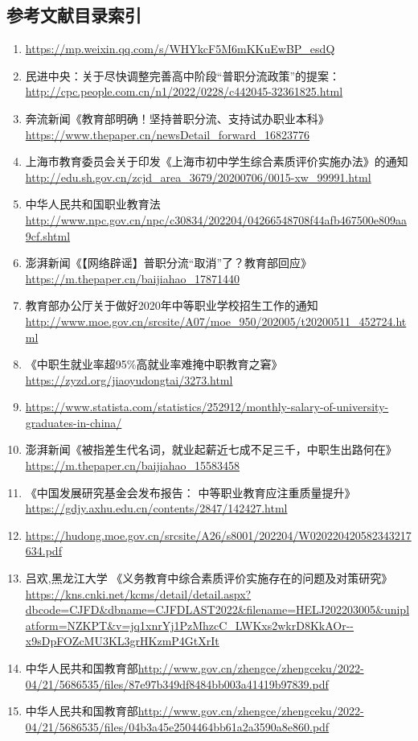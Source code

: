 \documentclass[12pt,UTF8]{ctexart}
\begin{document}
\subsection{参考文献目录索引}
\begin{enumerate}[1.]
\item \url{https://mp.weixin.qq.com/s/WHYkcF5M6mKKuEwBP_esdQ}
\item 民进中央：关于尽快调整完善高中阶段“普职分流政策”的提案：\url{http://cpc.people.com.cn/n1/2022/0228/c442045-32361825.html}
\item 奔流新闻《教育部明确！坚持普职分流、支持试办职业本科》 \url{https://www.thepaper.cn/newsDetail_forward_16823776}
\item 上海市教育委员会关于印发《上海市初中学生综合素质评价实施办法》的通知\url{http://edu.sh.gov.cn/zcjd_area_3679/20200706/0015-xw_99991.html}
\item 中华人民共和国职业教育法\url{http://www.npc.gov.cn/npc/c30834/202204/04266548708f44afb467500e809aa9cf.shtml}
\item 澎湃新闻《【网络辟谣】普职分流“取消”了？教育部回应》\url{https://m.thepaper.cn/baijiahao_17871440}
\item 教育部办公厅关于做好2020年中等职业学校招生工作的通知\url{http://www.moe.gov.cn/srcsite/A07/moe_950/202005/t20200511_452724.html}
\item 《中职生就业率超95\%高就业率难掩中职教育之窘》\url{https://zyzd.org/jiaoyudongtai/3273.html}
\item \url{https://www.statista.com/statistics/252912/monthly-salary-of-university-graduates-in-china/}
\item 澎湃新闻《被指差生代名词，就业起薪近七成不足三千，中职生出路何在》\url{https://m.thepaper.cn/baijiahao_15583458}
\item 《中国发展研究基金会发布报告： 中等职业教育应注重质量提升》 \url{https://gdjy.axhu.edu.cn/contents/2847/142427.html}
\item \url{https://hudong.moe.gov.cn/srcsite/A26/s8001/202204/W020220420582343217634.pdf}
\item 吕欢,黑龙江大学 《义务教育中综合素质评价实施存在的问题及对策研究》\url{https://kns.cnki.net/kcms/detail/detail.aspx?dbcode=CJFD&dbname=CJFDLAST2022&filename=HELJ202203005&uniplatform=NZKPT&v=jq1xnrYj1PzMhzcC_LWKxs2wkrD8KkAOr--x9sDpFOZcMU3KL3grHKzmP4GtXrIt}
\item 中华人民共和国教育部\url{http://www.gov.cn/zhengce/zhengceku/2022-04/21/5686535/files/87e97b349df8484bb003a41419b97839.pdf}
\item 中华人民共和国教育部\url{http://www.gov.cn/zhengce/zhengceku/2022-04/21/5686535/files/04b3a45e2504464bb61a2a3590a8e860.pdf}

\end{enumerate}
\end{document}
